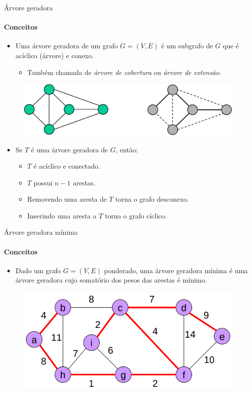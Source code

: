 \begin{frame}{Árvore geradora}
	\framesubtitle{Conceitos}
	
	\begin{itemize}
		\item Uma {\color{magenta}árvore geradora} de um grafo $G = (V, E)$ é um subgrafo de $G$ que é acíclico (árvore) e conexo.
		\begin{itemize}
			\item Também chamada de \textit{árvore de cobertura} ou \textit{árvore de extensão}.
		\end{itemize}
	\end{itemize}

	\begin{figure}
		\centering
		\includegraphics[width=0.9\linewidth]{img/arvore-geradora}
	\end{figure}
	
	\pause
	
	\begin{itemize}
		\item Se $T$ é uma árvore geradora de $G$, então:
		\begin{itemize}
			\item $T$ é acíclico e conectado.
			\item $T$ possui $n - 1$ arestas.
			\item Removendo uma aresta de $T$ torna o grafo desconexo.
			\item Inserindo uma aresta a $T$ torna o grafo cíclico.
		\end{itemize}
	\end{itemize}
\end{frame}



\begin{frame}{Árvore geradora mínima}
	\framesubtitle{Conceitos}
	
	\begin{itemize}
		\item Dado um grafo $G = (V, E)$ ponderado, uma {\color{magenta}árvore geradora mínima} é uma árvore geradora cujo somatório dos pesos das arestas é mínimo.
	\end{itemize}

	\begin{figure}
		\centering
		\includegraphics[width=0.55\linewidth]{img/arvore-cobertura-minima}
	\end{figure}
\end{frame}



